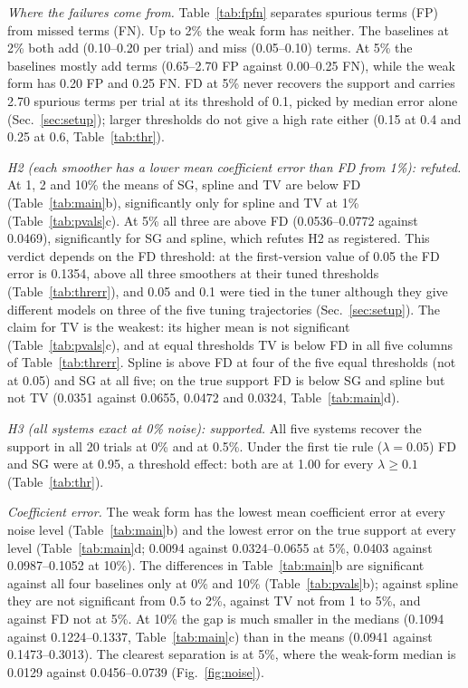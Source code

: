 \textit{Where the failures come from.} Table~\ref{tab:fpfn} separates spurious terms (FP) from missed terms (FN). Up to 2\% the weak form has neither. The baselines at 2\% both add (0.10--0.20 per trial) and miss (0.05--0.10) terms. At 5\% the baselines mostly add terms (0.65--2.70 FP against 0.00--0.25 FN), while the weak form has 0.20 FP and 0.25 FN. FD at 5\% never recovers the support and carries 2.70 spurious terms per trial at its threshold of 0.1, picked by median error alone (Sec.~\ref{sec:setup}); larger thresholds do not give a high rate either (0.15 at 0.4 and 0.25 at 0.6, Table~\ref{tab:thr}).

\begin{table}[t]\centering\caption{Mean false positives / false negatives per trial (30 coefficients, 7 nonzero).}\label{tab:fpfn}
\setlength{\tabcolsep}{4pt}\end{table}

\textit{H2 (each smoother has a lower mean coefficient error than FD from 1\%): refuted.} At 1, 2 and 10\% the means of SG, spline and TV are below FD (Table~\ref{tab:main}b), significantly only for spline and TV at 1\% (Table~\ref{tab:pvals}c). At 5\% all three are above FD (0.0536--0.0772 against 0.0469), significantly for SG and spline, which refutes H2 as registered. This verdict depends on the FD threshold: at the first-version value of 0.05 the FD error is 0.1354, above all three smoothers at their tuned thresholds (Table~\ref{tab:threrr}), and 0.05 and 0.1 were tied in the tuner although they give different models on three of the five tuning trajectories (Sec.~\ref{sec:setup}). The claim for TV is the weakest: its higher mean is not significant (Table~\ref{tab:pvals}c), and at equal thresholds TV is below FD in all five columns of Table~\ref{tab:threrr}. Spline is above FD at four of the five equal thresholds (not at 0.05) and SG at all five; on the true support FD is below SG and spline but not TV (0.0351 against 0.0655, 0.0472 and 0.0324, Table~\ref{tab:main}d).

\textit{H3 (all systems exact at 0\% noise): supported.} All five systems recover the support in all 20 trials at 0\% and at 0.5\%. Under the first tie rule ($\lambda=0.05$) FD and SG were at 0.95, a threshold effect: both are at 1.00 for every $\lambda\ge0.1$ (Table~\ref{tab:thr}).

\textit{Coefficient error.} The weak form has the lowest mean coefficient error at every noise level (Table~\ref{tab:main}b) and the lowest error on the true support at every level (Table~\ref{tab:main}d; 0.0094 against 0.0324--0.0655 at 5\%, 0.0403 against 0.0987--0.1052 at 10\%). The differences in Table~\ref{tab:main}b are significant against all four baselines only at 0\% and 10\% (Table~\ref{tab:pvals}b); against spline they are not significant from 0.5 to 2\%, against TV not from 1 to 5\%, and against FD not at 5\%. At 10\% the gap is much smaller in the medians (0.1094 against 0.1224--0.1337, Table~\ref{tab:main}c) than in the means (0.0941 against 0.1473--0.3013). The clearest separation is at 5\%, where the weak-form median is 0.0129 against 0.0456--0.0739 (Fig.~\ref{fig:noise}).

